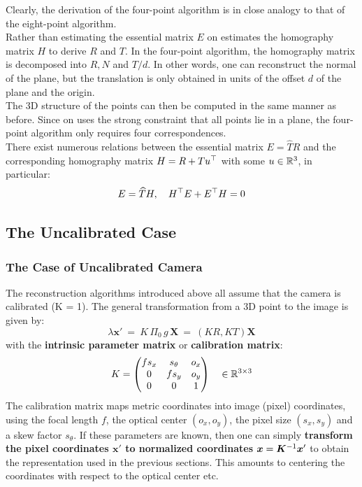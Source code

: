 Clearly, the derivation of the four-point algorithm is in close
analogy to that of the eight-point algorithm.\\

Rather than estimating the essential matrix $E$ on estimates the
homography matrix $H$ to derive $R$ and $T$.
In the four-point algorithm, the homography matrix is decomposed
into $R,N$ and $T/d$.
In other words, one can reconstruct the normal of the plane,
but the translation is only obtained in units of the offset $d$
of the plane and the origin.\\

The 3D structure of the points can then be computed in the same manner as before.
Since on uses the strong constraint that all points lie in a plane,
the four-point algorithm only requires four correspondences.\\

There exist numerous relations between the essential matrix $E = \widehat{T}R$
and the corresponding homography matrix $H = R + T u^{\top}$
with some $u \in \mathbb{R}^3$, in particular:
\[
	E = \widehat{T}H, \quad H^{\top} E + E^{\top} H = 0
\]


\subsection{The Uncalibrated Case}%
\label{sub:the_uncalibrated_case}


\subsubsection*{The Case of Uncalibrated Camera}%
\label{ssub:the_case_of_uncalibrated_camera}


The reconstruction algorithms introduced above all assume that the camera
is calibrated (K = 1). The general transformation from a 3D point to the
image is given by:
\[
	\lambda \bm{x}'\
		=\ K\, \Pi_0\, g\, \bm{X} \
		=\ (KR, KT) \bm{X}
\]
with the \textbf{intrinsic parameter matrix} or \textbf{calibration matrix}:
\[
	K = \begin{pmatrix}
		f s_x & s_{\theta} & o_x \\
		0     & f s_y & o_y \\
		0     & 0     & 1
	\end{pmatrix}
	\quad \in \mathbb{R}^{3 \times{} 3}
\]
The calibration matrix maps metric coordinates into image (pixel) coordinates,
using the focal length $f$, the optical center $(o_x, o_y)$,
the pixel size $(s_x, s_y)$ and a skew factor $s_{\theta}$.
If these parameters are known, then one can simply
\textbf{transform the pixel coordinates $\bm{x}'$ to normalized coordinates}
$\bm{x} = \bm{K}^{-1} \bm{x}'$
to obtain the representation used in the previous sections.
This amounts to centering the coordinates with respect to the optical center etc.


